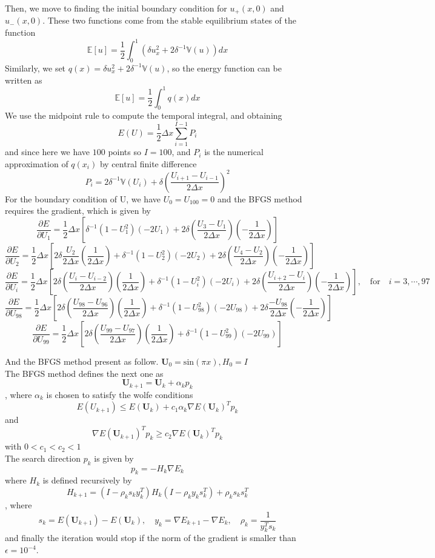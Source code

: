 \documentclass{article}
\begin{document}
\noindent
Then, we move to finding the initial boundary condition for $u_+(x,0)$ and $u_-(x,0)$.
These two functions come from the stable equilibrium states of the function$$\mathbb{E}[u] = \frac{1}{2}\int_{0}^{1}(\delta u_x^2 + 2\delta^{-1}\mathbb{V}(u))dx$$
Similarly, we set $q(x) = \delta u_x^2 + 2\delta^{-1}\mathbb{V}(u)$, so the energy function can be written as $$\mathbb{E}[u] = \frac{1}{2}\int_{0}^{1}q(x)dx$$
We use the midpoint rule to compute the temporal integral, and obtaining $$E(U) = \frac{1}{2}\Delta x\sum_{i=1}^{I-1}P_i$$ and since here we have $100$ points so $I = 100$, and $P_i$ is the numerical approximation of $q(x_i)$ by central finite difference$$P_i = 2\delta^{-1}\mathbb{V}(U_i) + \delta (\frac{U_{i+1} - U_{i-1}}{2\Delta x})^2$$
For the boundary condition of U, we have $U_0 = U_{100} = 0$ and the BFGS method requires the gradient, which is given by
\[
\frac{\partial E}{\partial U_1} = \frac{1}{2}\Delta x\left[\delta^{-1}(1-U_1^2)(-2U_1) + 2\delta(\frac{U_3 - U_1}{2\Delta x})(-\frac{1}{2\Delta x})\right]
\]
\[
\frac{\partial E}{\partial U_2} = \frac{1}{2}\Delta x\left[2\delta\frac{U_2}{2\Delta x}(\frac{1}{2\Delta x})+\delta^{-1}(1 - U_2^2)(-2U_2) + 2\delta(\frac{U_4 - U_2}{2\Delta x})(-\frac{1}{2\Delta x})\right]
\]
\[
\frac{\partial E}{\partial U_i} = \frac{1}{2}\Delta x\left[2\delta(\frac{U_i - U_{i-2}}{2\Delta x})(\frac{1}{2\Delta x})+\delta^{-1}(1 - U_i^2)(-2U_i) + 2\delta(\frac{U_{i+2} - U_i}{2\Delta x})(-\frac{1}{2\Delta x})\right], \quad \text{for} \quad i = 3,\cdots,97
\]
\[
\frac{\partial E}{\partial U_{98}} = \frac{1}{2}\Delta x\left[2\delta(\frac{U_{98} - U_{96}}{2\Delta x})(\frac{1}{2\Delta x}) + \delta^{-1}(1 - U_{98}^2)(-2U_{98}) + 2\delta\frac{-U_{98}}{2\Delta x}(-\frac{1}{2\Delta x})\right]
\]
\[
\frac{\partial E}{\partial U_{99}} = \frac{1}{2}\Delta x\left[2\delta(\frac{U_{99} - U_{97}}{2\Delta x})(\frac{1}{2\Delta x}) + \delta^{-1}(1 - U_{99}^2)(-2U_{99})\right]
\]

\noindent
And the BFGS method present as follow.
$\textbf{U}_0 = \text{sin}(\pi x), H_0 = I$\\
The BFGS method defines the next one as $$\textbf{U}_{k+1} =\textbf{U}_k + \alpha_k p_k$$, where $\alpha_k$ is chosen to satisfy the wolfe conditions
\[
E(U_{k+1}) \leq E(\textbf{U}_k) + c_1 \alpha_k \nabla E(\textbf{U}_k)^T p_k
\]
and 
\[
\nabla E(\textbf{U}_{k+1})^T p_k \geq c_2 \nabla E(\textbf{U}_k)^T p_k
\]
with $0 < c_1 < c_2 < 1$\\
The search direction $p_k$ is given by $$p_k = -H_k\nabla E_k$$
where $H_k$ is defined recursively by $$H_{k+1} = (I -\rho_k s_k y_k^T)H_k(I - \rho_k y_k s_k^T)+\rho_ks_ks_k^T$$, where $$s_k = E(\textbf{U}_{k+1}) - E(\textbf{U}_k),\quad y_k = \nabla E_{k+1} - \nabla E_k, \quad \rho_k = \frac{1}{y_k^Ts_k}$$
and finally the iteration would stop if the norm of the gradient is smaller than $\epsilon = 10^{-4}$.
\end{document}
